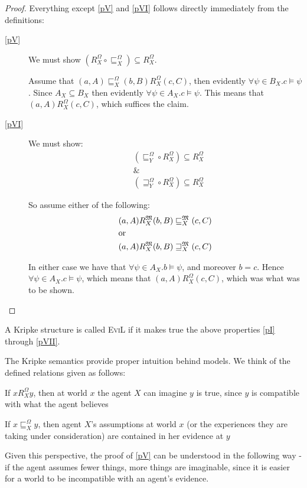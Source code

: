 \begin{proof}
  Everything except \ref{pV} and \ref{pVI} follows directly
  immediately from the definitions:
\begin{description}
  \item[\ref{pV}] We must show
$(R^{\Omega}_X \circ \sqsubseteq^{\Omega}_X) \subseteq R^{\Omega}_X$.
  
  Assume that $(a, A) \sqsubseteq_X^{\Omega} (b, B) R_X^{\Omega} (c,C) $, then evidently $\forall \psi \in
  B_X .c \models \psi$. Since $A_X \subseteq B_X$ then evidently $\forall \psi \in
  A_X .c \models \psi$.  This means that $(a,A) R^{\Omega}_X (c,C)$,
  which suffices the claim.
  
\item[\ref{pVI}] We must show:
\begin{eqnarray*}
 & (\sqsubseteq^{\Omega}_Y \circ R^{\Omega}_X)
       \subseteq R^{\Omega}_X\\
& \& \\
&  (\sqsupseteq^{\Omega}_Y \circ R^{\Omega}_X) \subseteq R^{\Omega}_X 
\end{eqnarray*}

So assume either of the following:
\begin{eqnarray*}
&(a,A) R^{\Omega}_X (b,B) \sqsubseteq^{\Omega}_X (c,C)\\
&\textup{or} \\
&(a,A) R^{\Omega}_X (b,B) \sqsupseteq^{\Omega}_X (c,C)
\end{eqnarray*}

In either case we have that $\forall \psi \in
  A_X .b \models \psi$, and moreover $b =c$.  Hence $\forall \psi \in
  A_X .c \models \psi$, which means that $(a,A) R^{\Omega}_X (c,C)$,
  which was what was to be shown.
\end{description}
\end{proof}

\begin{definition}\label{evil-kripke-structures}
A Kripke structure is called \textsc{EviL} if it makes true the
  above properties \ref{pI} through \ref{pVII}.
\end{definition}


The Kripke semantics provide proper intuition behind
 models. We think of the defined relations given as follows:
\begin{itemizedot}
  \item If $x R^{\Omega}_X y$, then at world $x$ the agent $X$ can imagine $y$ is true, since $y$ is compatible with what the agent believes 
  \item If $x \sqsubseteq^{\Omega}_X y$, then agent $X$'s
  assumptions at world $x$ (or the experiences they are taking under consideration) are  contained in her evidence at $y$
\end{itemizedot}
Given this perspective, the proof of \ref{pV} can be understood in the
following way - if the agent assumes fewer things, more things are imaginable,
since it is easier for a world to be incompatible with an agent's evidence.

